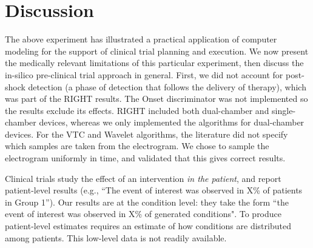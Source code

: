 \section{Discussion}
\label{sec:discussion}

The above experiment has illustrated a practical application of computer modeling for the support of clinical trial planning and execution.
We now present the medically relevant limitations of this particular experiment, then discuss the in-silico pre-clinical trial approach in general.
First, we did not account for post-shock detection (a phase of detection that follows the delivery of therapy), which was part of the RIGHT results.
The Onset discriminator was not implemented so the results exclude its effects.
RIGHT included both dual-chamber and single-chamber devices, whereas we only implemented the algorithms for dual-chamber devices.
For the VTC and Wavelet algorithms, the literature did not specify which samples are taken from the electrogram. 
We chose to sample the electrogram uniformly in time, and validated that this gives correct results.

Clinical trials study the effect of an intervention \emph{in the patient}, and report patient-level results (e.g., ``The event of interest was observed in X\% of patients in Group 1''). 
Our results are at the condition level: they take the form ``the event of interest was observed in X\% of generated conditions".
To produce patient-level estimates requires an estimate of how conditions are distributed among patients. 
This low-level data is not readily available.

